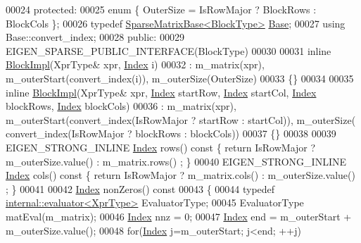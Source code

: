 \begin{DoxyCode}
00024 \textcolor{keyword}{protected}:
00025     \textcolor{keyword}{enum} \{ OuterSize = IsRowMajor ? BlockRows : BlockCols \};
00026     \textcolor{keyword}{typedef} \hyperlink{group___sparse_core___module_class_eigen_1_1_sparse_matrix_base}{SparseMatrixBase<BlockType>} \hyperlink{group___sparse_core___module_class_eigen_1_1_sparse_matrix_base}{Base};
00027     \textcolor{keyword}{using} Base::convert\_index;
00028 \textcolor{keyword}{public}:
00029     EIGEN\_SPARSE\_PUBLIC\_INTERFACE(BlockType)
00030 
00031     \textcolor{keyword}{inline} \hyperlink{class_eigen_1_1_block_impl}{BlockImpl}(XprType& xpr, \hyperlink{group___core___module_a554f30542cc2316add4b1ea0a492ff02}{Index} i)
00032       : m\_matrix(xpr), m\_outerStart(convert\_index(i)), m\_outerSize(OuterSize)
00033     \{\}
00034 
00035     \textcolor{keyword}{inline} \hyperlink{class_eigen_1_1_block_impl}{BlockImpl}(XprType& xpr, \hyperlink{group___core___module_a554f30542cc2316add4b1ea0a492ff02}{Index} startRow, \hyperlink{group___core___module_a554f30542cc2316add4b1ea0a492ff02}{Index} startCol, 
      \hyperlink{group___core___module_a554f30542cc2316add4b1ea0a492ff02}{Index} blockRows, \hyperlink{group___core___module_a554f30542cc2316add4b1ea0a492ff02}{Index} blockCols)
00036       : m\_matrix(xpr), m\_outerStart(convert\_index(IsRowMajor ? startRow : startCol)), m\_outerSize(
      convert\_index(IsRowMajor ? blockRows : blockCols))
00037     \{\}
00038 
00039     EIGEN\_STRONG\_INLINE \hyperlink{group___core___module_a554f30542cc2316add4b1ea0a492ff02}{Index} rows()\textcolor{keyword}{ const }\{ \textcolor{keywordflow}{return} IsRowMajor ? m\_outerSize.value() : m\_matrix.rows()
      ; \}
00040     EIGEN\_STRONG\_INLINE \hyperlink{group___core___module_a554f30542cc2316add4b1ea0a492ff02}{Index} cols()\textcolor{keyword}{ const }\{ \textcolor{keywordflow}{return} IsRowMajor ? m\_matrix.cols() : m\_outerSize.value()
      ; \}
00041 
00042     \hyperlink{group___core___module_a554f30542cc2316add4b1ea0a492ff02}{Index} nonZeros()\textcolor{keyword}{ const}
00043 \textcolor{keyword}{    }\{
00044       \textcolor{keyword}{typedef} \hyperlink{struct_eigen_1_1internal_1_1evaluator}{internal::evaluator<XprType>} EvaluatorType;
00045       EvaluatorType matEval(m\_matrix);
00046       \hyperlink{group___core___module_a554f30542cc2316add4b1ea0a492ff02}{Index} nnz = 0;
00047       \hyperlink{group___core___module_a554f30542cc2316add4b1ea0a492ff02}{Index} end = m\_outerStart + m\_outerSize.value();
00048       \textcolor{keywordflow}{for}(\hyperlink{group___core___module_a554f30542cc2316add4b1ea0a492ff02}{Index} j=m\_outerStart; j<end; ++j)

\end{DoxyCode}
